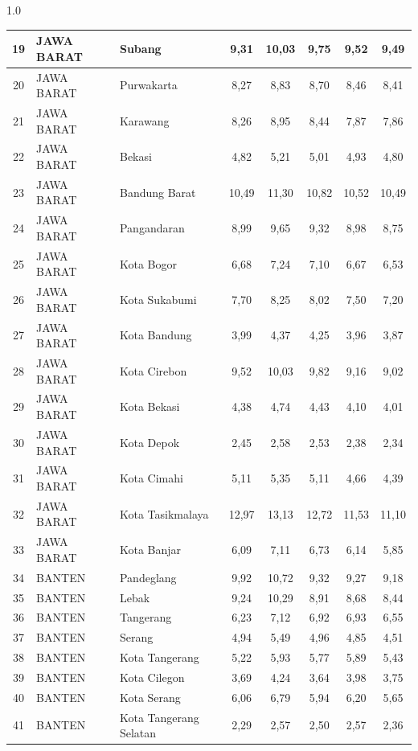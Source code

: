 \begin{spacing}{1.0}
\begin{longtable}{|c|p{2.2cm}|p{2.8cm}|c|c|c|c|c|}
19 & JAWA BARAT & Subang & 9,31 & 10,03 & 9,75 & 9,52 & 9,49 \\ \hline
20 & JAWA BARAT & Purwakarta & 8,27 & 8,83 & 8,70 & 8,46 & 8,41 \\ \hline
21 & JAWA BARAT & Karawang & 8,26 & 8,95 & 8,44 & 7,87 & 7,86 \\ \hline
22 & JAWA BARAT & Bekasi & 4,82 & 5,21 & 5,01 & 4,93 & 4,80 \\ \hline
23 & JAWA BARAT & Bandung Barat & 10,49 & 11,30 & 10,82 & 10,52 & 10,49 \\ \hline
24 & JAWA BARAT & Pangandaran & 8,99 & 9,65 & 9,32 & 8,98 & 8,75 \\ \hline
25 & JAWA BARAT & Kota Bogor & 6,68 & 7,24 & 7,10 & 6,67 & 6,53 \\ \hline
26 & JAWA BARAT & Kota Sukabumi & 7,70 & 8,25 & 8,02 & 7,50 & 7,20 \\ \hline
27 & JAWA BARAT & Kota Bandung & 3,99 & 4,37 & 4,25 & 3,96 & 3,87 \\ \hline
28 & JAWA BARAT & Kota Cirebon & 9,52 & 10,03 & 9,82 & 9,16 & 9,02 \\ \hline
29 & JAWA BARAT & Kota Bekasi & 4,38 & 4,74 & 4,43 & 4,10 & 4,01 \\ \hline
30 & JAWA BARAT & Kota Depok & 2,45 & 2,58 & 2,53 & 2,38 & 2,34 \\ \hline
31 & JAWA BARAT & Kota Cimahi & 5,11 & 5,35 & 5,11 & 4,66 & 4,39 \\ \hline
32 & JAWA BARAT & Kota Tasikmalaya & 12,97 & 13,13 & 12,72 & 11,53 & 11,10 \\ \hline
33 & JAWA BARAT & Kota Banjar & 6,09 & 7,11 & 6,73 & 6,14 & 5,85 \\ \hline
34 & BANTEN & Pandeglang & 9,92 & 10,72 & 9,32 & 9,27 & 9,18 \\ \hline
35 & BANTEN & Lebak & 9,24 & 10,29 & 8,91 & 8,68 & 8,44 \\ \hline
36 & BANTEN & Tangerang & 6,23 & 7,12 & 6,92 & 6,93 & 6,55 \\ \hline
37 & BANTEN & Serang & 4,94 & 5,49 & 4,96 & 4,85 & 4,51 \\ \hline
38 & BANTEN & Kota Tangerang & 5,22 & 5,93 & 5,77 & 5,89 & 5,43 \\ \hline
39 & BANTEN & Kota Cilegon & 3,69 & 4,24 & 3,64 & 3,98 & 3,75 \\ \hline
40 & BANTEN & Kota Serang & 6,06 & 6,79 & 5,94 & 6,20 & 5,65 \\ \hline
41 & BANTEN & Kota Tangerang Selatan & 2,29 & 2,57 & 2,50 & 2,57 & 2,36 \\ \hline
\end{longtable}
\end{spacing}
\newpage
